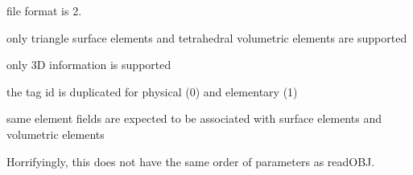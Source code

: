 \begin{DoxyRefList}
file format is 2. 



only triangle surface elements and tetrahedral volumetric elements are supported 



only 3D information is supported 



the tag id is duplicated for physical (0) and elementary (1) 



same element fields are expected to be associated with surface elements and volumetric elements  
\item[Member \doxylink{namespaceigl_a1a1761a85ec5cdef44ce8104d0ccdc3f}{igl\+::write\+OBJ} (const std\+::string str, const Eigen\+::\+Matrix\+Base$<$ Derived\+V $>$ \&V, const Eigen\+::\+Matrix\+Base$<$ Derived\+F $>$ \&F, const Eigen\+::\+Matrix\+Base$<$ Derived\+CN $>$ \&CN, const Eigen\+::\+Matrix\+Base$<$ Derived\+FN $>$ \&FN, const Eigen\+::\+Matrix\+Base$<$ Derived\+TC $>$ \&TC, const Eigen\+::\+Matrix\+Base$<$ Derived\+FTC $>$ \&FTC)]\label{bug__bug000029}%
%
Horrifyingly, this does not have the same order of parameters as read\+OBJ.
\end{DoxyRefList}